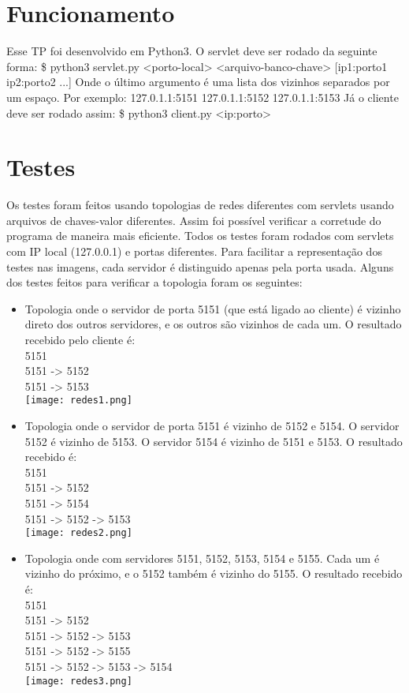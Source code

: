 \documentclass[10pt]{article}
\begin{document}
\section{Funcionamento}
Esse TP foi desenvolvido em Python3.
\newline O servlet deve ser rodado da seguinte forma:
\newline \$ python3 servlet.py <porto-local> <arquivo-banco-chave> [ip1:porto1 ip2:porto2 ...]
\newline Onde o último argumento é uma lista dos vizinhos separados por um espaço. Por exemplo: 127.0.1.1:5151 127.0.1.1:5152 127.0.1.1:5153
\newline Já o cliente deve ser rodado assim:
\newline \$ python3 client.py <ip:porto>
		\section{Testes}
			Os testes foram feitos usando topologias de redes diferentes com servlets usando arquivos de chaves-valor diferentes. Assim foi possível verificar a corretude do programa de maneira mais eficiente.
			\newline Todos os testes foram rodados com servlets com IP local (127.0.0.1) e portas diferentes. Para facilitar a representação dos testes nas imagens, cada servidor é distinguido apenas pela porta usada. Alguns dos testes feitos para verificar a topologia foram os seguintes:
			\begin{itemize}
			    \item Topologia onde o servidor de porta 5151 (que está ligado ao cliente) é vizinho direto dos outros servidores, e os outros são vizinhos de cada um. O resultado recebido pelo cliente é: \\ 5151 \\ 5151 -> 5152 \\ 5151 -> 5153 \\ \texttt{[image: redes1.png]}
			    \item Topologia onde o servidor de porta 5151 é vizinho de 5152 e 5154. O servidor 5152 é vizinho de 5153. O servidor 5154 é vizinho de 5151 e 5153. O resultado recebido é: \\ 5151 \\ 5151 -> 5152 \\ 5151 -> 5154 \\ 5151 -> 5152 -> 5153 \\
			   \texttt{[image: redes2.png]}
			   \item Topologia onde com servidores 5151, 5152, 5153, 5154 e 5155. Cada um é vizinho do próximo, e o 5152 também é vizinho do 5155. O resultado recebido é: \\ 5151 \\ 5151 -> 5152 \\ 5151 -> 5152 -> 5153 \\ 5151 -> 5152 -> 5155 \\ 5151 -> 5152 -> 5153 -> 5154 \\
			   \texttt{[image: redes3.png]}
			\end{itemize}
\end{document}
